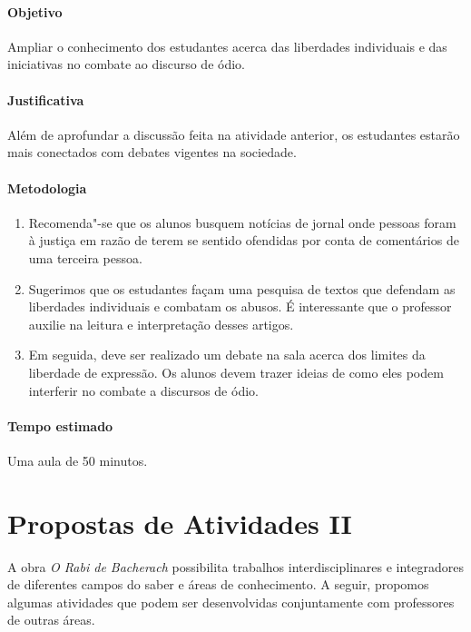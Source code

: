 \documentclass[12pt]{extarticle}
\begin{document}
\paragraph{Objetivo} Ampliar o conhecimento dos estudantes
acerca das liberdades individuais e das iniciativas no combate ao discurso de ódio.

\paragraph{Justificativa} Além de aprofundar a discussão feita
na atividade anterior, os estudantes estarão mais conectados com debates
vigentes na sociedade.

\paragraph{Metodologia} 

\begin{enumerate}

\item Recomenda"-se que os alunos busquem notícias de jornal onde pessoas foram
à justiça em razão de terem se sentido ofendidas por conta de
comentários de uma terceira pessoa.

\item Sugerimos que os estudantes façam uma pesquisa de 
textos que defendam as liberdades individuais e
combatam os abusos. É interessante que o professor auxilie
 na leitura e interpretação desses artigos.
 
\item Em seguida, deve ser realizado um
debate na sala acerca dos limites da liberdade de expressão.
Os alunos devem trazer ideias de como eles
podem interferir no combate a discursos de ódio.

\end{enumerate}

\paragraph{Tempo estimado} Uma aula de 50 minutos.


\section{Propostas de Atividades II}

A obra \emph{O Rabi de Bacherach} possibilita trabalhos
interdisciplinares e integradores de diferentes campos do saber e áreas
de conhecimento. A seguir, propomos algumas atividades que podem ser
desenvolvidas conjuntamente com professores de outras áreas. 
\end{document}
